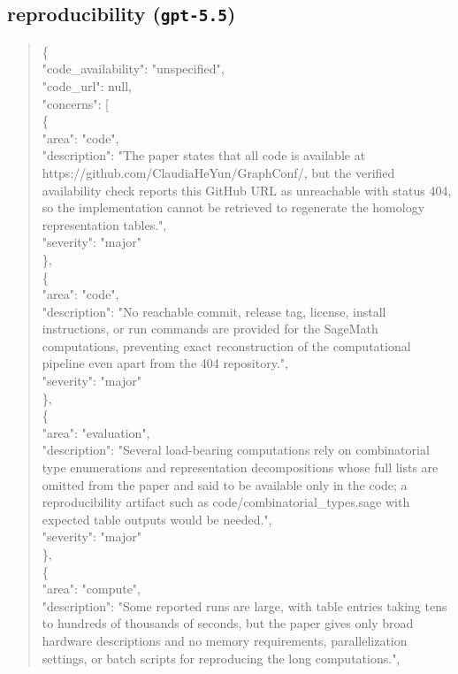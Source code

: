 \documentclass[11pt]{article}
\begin{document}
\subsection*{reproducibility (\texttt{gpt-5.5})}
\begin{quote}\small\ttfamily\raggedright
\{\\
  "code\_availability": "unspecified",\\
  "code\_url": null,\\
  "concerns": [\\
    \{\\
      "area": "code",\\
      "description": "The paper states that all code is available at https://github.com/ClaudiaHeYun/GraphConf/, but the verified availability check reports this GitHub URL as unreachable with status 404, so the implementation cannot be retrieved to regenerate the homology representation tables.",\\
      "severity": "major"\\
    \},\\
    \{\\
      "area": "code",\\
      "description": "No reachable commit, release tag, license, install instructions, or run commands are provided for the SageMath computations, preventing exact reconstruction of the computational pipeline even apart from the 404 repository.",\\
      "severity": "major"\\
    \},\\
    \{\\
      "area": "evaluation",\\
      "description": "Several load-bearing computations rely on combinatorial type enumerations and representation decompositions whose full lists are omitted from the paper and said to be available only in the code; a reproducibility artifact such as code/combinatorial\_types.sage with expected table outputs would be needed.",\\
      "severity": "major"\\
    \},\\
    \{\\
      "area": "compute",\\
      "description": "Some reported runs are large, with table entries taking tens to hundreds of thousands of seconds, but the paper gives only broad hardware descriptions and no memory requirements, parallelization settings, or batch scripts for reproducing the long computations.",\\

\end{quote}
\end{document}
